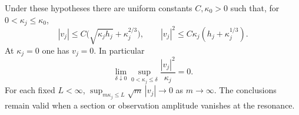 \begin{theorem}
\label{thm:v58-flat-contact}
Under these hypotheses there are uniform constants $C,\kappa_0>0$
such that, for $0<\kappa_j\le\kappa_0$,
\begin{equation}\label{eq:v58-sharp-drift}
 |v_j|\le C\bigl(\sqrt{\kappa_jh_j}+\kappa_j^{2/3}\bigr),\qquad
 |v_j|^2\le C\kappa_j(h_j+\kappa_j^{1/3}).
\end{equation}
At $\kappa_j=0$ one has $v_j=0$. In particular
\begin{equation}\label{eq:v58-flat-ratio}
 \lim_{\delta\downarrow0}\sup_{0<\kappa_j\le\delta}
                  \frac{|v_j|^2}{\kappa_j}=0.
\end{equation}
For each fixed $L<\infty$,
$\sup_{m\kappa_j\le L}\sqrt m\,|v_j|\to0$ as $m\to\infty$.
The conclusions remain valid when a section or observation amplitude
vanishes at the resonance.
\end{theorem}
